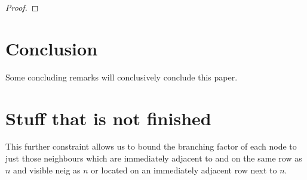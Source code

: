 \begin{proof}
%
%
%
%
%	
%
%
%
\end{proof}

\section{Conclusion}
Some concluding remarks will conclusively conclude this paper.

\section{Stuff that is not finished}
This further constraint allows us to bound the branching factor of each
node to just those neighbours which are immediately adjacent to and on
the same row as $n$ and visible neig
as $n$ or located on an immediately adjacent 
row next to $n$.

